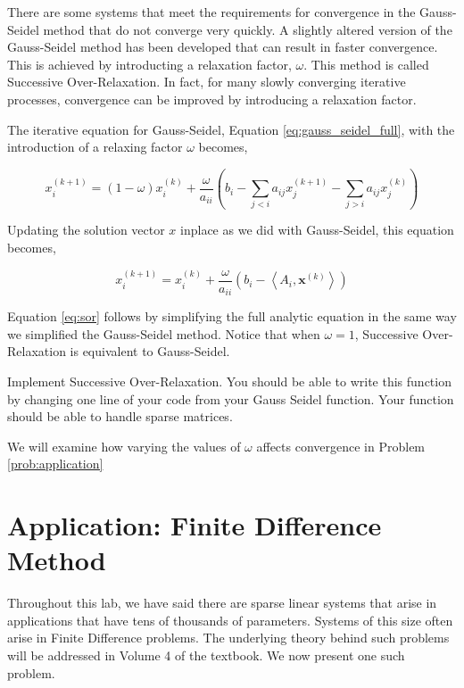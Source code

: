 There are some systems that meet the requirements for convergence in the
Gauss-Seidel method that do not converge very quickly. A slightly altered version
of the Gauss-Seidel method has been developed that can result in faster convergence.
This is achieved by introducting a relaxation factor, $\omega$. This method is
called Successive Over-Relaxation. In fact, for many slowly converging iterative processes, convergence can be improved by introducing a relaxation factor.

The iterative equation for Gauss-Seidel, Equation \ref{eq:gauss_seidel_full},
with the introduction of a relaxing factor $\omega$ becomes,

$$
x_i^{(k+1)} = (1 - \omega)x_i^{(k)} + \frac{\omega}{a_{ii}} \left (b_i - \sum_{j < i}a_{ij}x^{(k+1)}_j - \sum_{j > i}a_{ij}x^{(k)}_j \right )
$$

Updating the solution vector $x$ inplace as we did with Gauss-Seidel, this
equation becomes,

\begin{equation} \label{eq:sor}
x^{(k+1)}_i = x^{(k)}_i + \frac{\omega}{a_{ii}} \left ( b_i - \left < A_i, \mathbf{x}^{(k)} \right > \right )
\end{equation}

Equation \ref{eq:sor} follows by simplifying the full analytic equation in the
same way we simplified the Gauss-Seidel method. Notice that when $\omega = 1$,
Successive Over-Relaxation is equivalent to Gauss-Seidel.

\begin{problem}
Implement Successive Over-Relaxation. You should be able to write
this function by changing one line of your code from your Gauss Seidel
function. Your function should be able to handle sparse matrices.

We will examine how varying the values of $\omega$ affects convergence in Problem \ref{prob:application}
\end{problem}

\section*{Application: Finite Difference Method} %

Throughout this lab, we have said there are sparse linear systems that arise in applications that have tens of thousands of parameters. Systems of this size
often arise in Finite Difference problems. The underlying theory behind such problems will be addressed in Volume 4 of the textbook. We now present one such problem.



